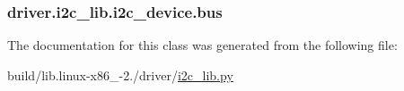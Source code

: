 \subsubsection[{bus}]{\setlength{\rightskip}{0pt plus 5cm}driver.\+i2c\+\_\+lib.\+i2c\+\_\+device.\+bus}\label{classdriver_1_1i2c__lib_1_1i2c__device_ac57614bbc2affcaf48f890e8a79c1e96}


The documentation for this class was generated from the following file\+:\begin{DoxyCompactItemize}
\item 
build/lib.\+linux-\/x86\+\_-\/2./driver/\hyperlink{build_2lib_8linux-x86__64-2_87_2driver_2i2c__lib_8py}{i2c\+\_\+lib.\+py}\end{DoxyCompactItemize}
